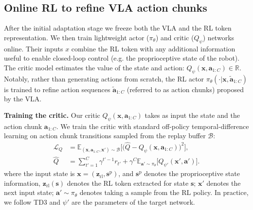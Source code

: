 

\subsection{Online RL to refine VLA action chunks}
\label{sec:chunk_rl}

After the initial adaptation stage we freeze both the VLA and the RL token representation. We then train lightweight actor ($\pi_\theta$) and critic ($Q_{\psi}$) networks online. Their inputs $x$ combine the RL token with any additional information useful to enable closed-loop control (e.g. the proprioceptive state of the robot). The critic model estimates the value of the state and action: $Q_{\psi}(\mathbf{x},\mathbf{a}_{1:C})\in \mathbb{R}$. Notably, rather than generating actions from scratch, the RL actor $\pi_\theta(\cdot | \mathbf{x}, \tilde{\mathbf{a}}_{1:C})$ is trained to refine action sequences $\tilde{\mathbf{a}}_{1:C}$ (referred to as action chunks) proposed by the VLA. 

\textbf{Training the critic.}  Our critic $Q_\psi( \mathbf{x},\mathbf{a}_{1:C})$ takes as input the state and the action chunk $\mathbf{a}_{1:C}$. We train the critic with standard off-policy temporal-difference learning on action chunk transitions sampled from the replay buffer $\mathcal{B}$:
\begin{equation}
\begin{aligned}
\mathcal{L}_Q&=\mathbb{E}_{(\mathbf{x}, \mathbf{a}_{1:C}, \mathbf{x}') \sim \mathcal{B}}
\Big[\big(\hat{Q}-Q_\psi(\mathbf{x}, \mathbf{a}_{1:C})
\big)^2\Big], \\
\hat{Q}&=\sum_{t'=1}^{C} \gamma^{t'-1} r_{t'}+\gamma^C\mathbb{E}_{\mathbf{a}' \sim \pi_\theta}
\Big[Q_{\psi'}(\mathbf{x}', \mathbf{a}')\Big].
\end{aligned}
\label{eq:critic_loss}
\end{equation}
where the input state is $\mathbf{x} =(\mathbf{z}_\text{rl}, \mathbf{s}^\text{p})$, and $\mathbf{s}^\text{p}$ denotes the proprioceptive state information, $\mathbf{z}_\text{rl}(\mathbf{s})$ denotes the RL token extracted for state $\mathbf{s}$; $\mathbf{x}'$ denotes the next input state; $\mathbf{a}' \sim \pi_\theta$ denotes taking a sample from the RL policy.  In practice, we follow TD3 \citep{fujimoto2018td3} and $\psi'$ are the parameters of the target network.



